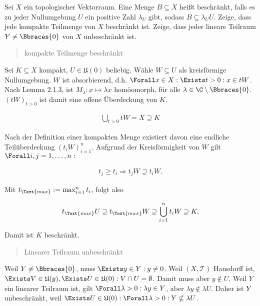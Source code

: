 \begin{exercise}

Sei $X$ ein topologischer Vektorraum.
Eine Menge $B \subseteq X$ heißt beschränkt, falls es zu jeder Nullumgebung $U$ ein positive Zahl $\lambda_U$ gibt, sodass $B \subseteq \lambda_U U$.
Zeige, dass jede kompakte Teilmenge von $X$ beschränkt ist. Zeige, dass jeder lineare Teilraum $Y \neq \Bbraces{0}$ von $X$ unbeschränkt ist.

\end{exercise}

\begin{solution}

\phantom{}

\blockquote{kompakte Teilmenge beschränkt}:
Sei $K \subseteq X$ kompakt, $U \in \mathfrak{U}(0)$ beliebig.
Wähle $W \subseteq U$ als kreisförmige Nullumgebung.
$W$ ist absorbierend, d.h. $\Forall x \in X: \Exists t > 0: x \in tW$.
Nach Lemma 2.1.3, ist $M_\lambda: x \mapsto \lambda x$ homöomorph, für alle $ \lambda \in \C \setminus \Bbraces{0}$.
$(tW)_{t > 0}$ ist damit eine offene Überdeckung von $K$.

\begin{align*}
  \bigcup_{t > 0} tW = X \supseteq K
\end{align*}

Nach der Definition einer kompakten Menge existiert davon eine endliche Teilüberdeckung $(t_i W)_{i=1}^n$.
Aufgrund der Kreisförmigkeit von $W$ gilt $\Forall i, j = 1, \ldots, n:$

\begin{align*}
  t_j \geq t_i
  \Rightarrow
  t_j W \supseteq t_i W.
\end{align*}

Mit $t_\Text{max} := \max_{i=1}^n t_i$, folgt also

\begin{align*}
  t_\Text{max} U
  \supseteq
  t_\Text{max} W
  \supseteq
  \bigcup_{i=1}^n t_i W
  \supseteq
  K.
\end{align*}

Damit ist $K$ beschränkt. \\

\blockquote{Linearer Teilraum unbeschränkt}:
Weil $Y \neq \Bbraces{0}$, muss $\Exists y \in Y: y \neq 0$. Weil $(X, \mathcal{T})$ Hausdorff ist, $\Exists V \in \mathfrak{U}(y), \Exists U \in \mathfrak{U}(0): V \cap U = \emptyset$.
Damit muss aber $y \notin U$.
Weil $Y$ ein linearer Teilraum ist, gilt $\Forall \lambda > 0: \lambda y \in Y$, aber $\lambda y \notin \lambda U$.
Daher ist $Y$ unbeschränkt, weil $\Exists U \in \mathfrak{U}(0): \Forall \lambda > 0: Y \not \subseteq \lambda U$.

\end{solution}
